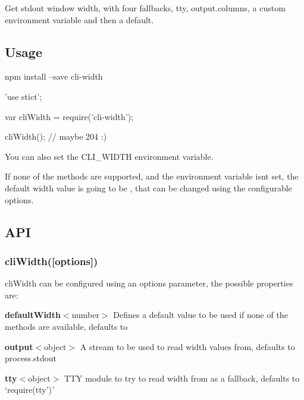 Get stdout window width, with four fallbacks, {\ttfamily tty}, {\ttfamily output.\+columns}, a custom environment variable and then a default.

\href{http://badge.fury.io/js/cli-width}{\tt } \href{https://travis-ci.org/knownasilya/cli-width}{\tt } \href{https://coveralls.io/github/knownasilya/cli-width?branch=master}{\tt }

\subsection*{Usage}


\begin{DoxyCode}
npm install --save cli-width
\end{DoxyCode}



\begin{DoxyCode}
'use stict';

var cliWidth = require('cli-width');

cliWidth(); // maybe 204 :)
\end{DoxyCode}


You can also set the {\ttfamily C\+L\+I\+\_\+\+W\+I\+D\+TH} environment variable.

If none of the methods are supported, and the environment variable isn\textquotesingle{}t set, the default width value is going to be {}, that can be changed using the configurable {\ttfamily options}.

\subsection*{A\+PI}

\subsubsection*{cli\+Width(\mbox{[}options\mbox{]})}

{\ttfamily cli\+Width} can be configured using an {\ttfamily options} parameter, the possible properties are\+:


\begin{DoxyItemize}
\item {\bfseries default\+Width}$<$number$>$ Defines a default value to be used if none of the methods are available, defaults to {}
\item {\bfseries output}$<$object$>$ A stream to be used to read width values from, defaults to {\ttfamily process.\+stdout}
\item {\bfseries tty}$<$object$>$ T\+TY module to try to read width from as a fallback, defaults to `require(\textquotesingle{}tty')\`{}
\end{DoxyItemize}


